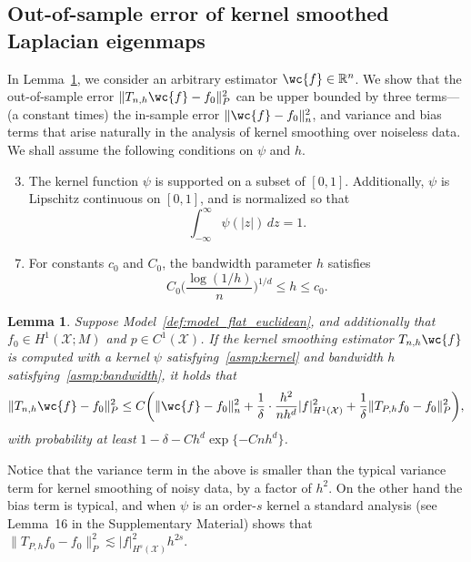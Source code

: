 \documentclass[aos]{imsart}
\theoremstyle{plain}
\newtheorem{lemma}{Lemma}
\theoremstyle{definition}
\theoremstyle{remark}
\def\R{\mathbb{R}}
\newcommand{\mc}[1]{\mathcal{#1}}
\newcommand{\Reals}{\mathbb{R}} %
\newcommand{\1}{\mathbf{1}}
\begin{document}
\subsection{Out-of-sample error of kernel smoothed Laplacian eigenmaps}

In Lemma~\ref{lem:kernel_smoothing_insample}, we consider an arbitrary estimator $\wc{f} \in \Reals^n$. We show that the out-of-sample error $\|T_{n,h}\wc{f} - f_0\|_P^2$ can be upper bounded by three terms--- (a constant times) the in-sample error $\|\wc{f} - f_0\|_n^2$, and variance and bias terms that arise naturally in the analysis of kernel smoothing over noiseless data. We shall assume the following conditions on $\psi$ and $h$.
\begin{enumerate}[label=(K\arabic*)]
	\setcounter{enumi}{2}
	\item
	\label{asmp:kernel}
	The kernel function $\psi$ is supported on a subset of $[0,1]$. Additionally, $\psi$ is Lipschitz continuous on $[0,1]$, and is normalized so that
	\begin{equation*}
	\int_{-\infty}^{\infty} \psi(|z|) \,dz = 1.
	\end{equation*}
\end{enumerate}
\begin{enumerate}[label=(P\arabic*)]
	\setcounter{enumi}{6}
	\item
	\label{asmp:bandwidth}
	For constants $c_0$ and $C_0$, the bandwidth parameter $h$ satisfies
	\begin{equation*}
	C_0\biggl(\frac{\log(1/h)}{n}\biggr)^{1/d} \leq h \leq c_0.
	\end{equation*}
\end{enumerate}
\begin{lemma}
	\label{lem:kernel_smoothing_insample}
	Suppose Model~\ref{def:model_flat_euclidean}, and additionally that $f_0 \in H^1(\mc{X};M)$ and $p \in C^1(\mc{X})$. If the kernel smoothing estimator $T_{n,h}\wc{f}$ is computed with a kernel $\psi$ satisfying~\ref{asmp:kernel} and bandwidth $h$ satisfying~\ref{asmp:bandwidth}, it holds that
	\begin{equation}
	\label{eqn:kernel_smoothing_insample}
	\|T_{n,h}\wc{f} - f_0\|_P^2 \leq C\biggl(\|\wc{f} - f_0\|_n^2 + \frac{1}{\delta} \cdot \frac{h^2}{nh^d} |f|_{H^1(\mc{X})}^2 + \frac{1}{\delta}\|T_{P,h}f_0 - f_0\|_P^2\biggr),
	\end{equation}
	with probability at least $1 - \delta - Ch^d\exp\{-Cnh^d\}$. 
\end{lemma}
Notice that the variance term in the above is smaller than the typical variance term for kernel smoothing of noisy data, by a factor of $h^2$. On the other hand the bias term is typical, and when $\psi$ is an order-$s$ kernel a standard analysis (see Lemma~16 in the Supplementary Material) shows that $\|T_{P,h}f_0 - f_0\|_P^2 \lesssim |f|_{H^s(\mc{X})}^2 h^{2s}$.
\end{document}
